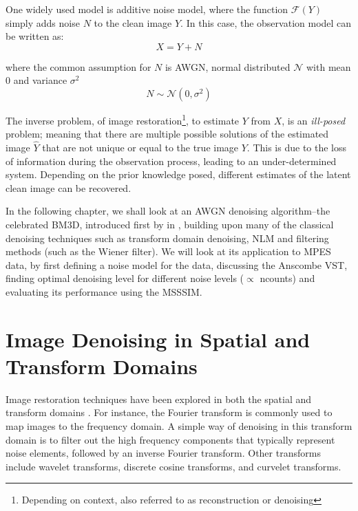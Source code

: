 One widely used model is additive noise model, where the function $\mathcal{F}(Y)$ simply adds noise $N$ to the clean image $Y$. In this case, the observation model can be written as:
\begin{equation}\label{eq:observation-model-additive}
    X = Y + N
\end{equation}

where the common assumption for $N$ is \gls{AWGN}, normal distributed $\mathcal{N}$ with mean \num{0} and variance $\sigma^2$
\begin{equation}\label{eq:awgn}
    N \sim \mathcal{N}(0, \sigma^2)
\end{equation}

The inverse problem, of image restoration\footnote{Depending on context, also referred to as reconstruction or denoising}, to estimate $Y$ from $X$, is an \textit{ill-posed} problem; meaning that there are multiple possible solutions of the estimated image $\hat{Y}$ that are not unique or equal to the true image $Y$. This is due to the loss of information during the observation process, leading to an under-determined system. Depending on the prior knowledge posed, different estimates of the latent clean image can be recovered.

In the following chapter, we shall look at an \gls{AWGN} denoising algorithm--the celebrated \gls{BM3D}, introduced first by \citeauthor{dabovImageDenoisingSparse2007} in \cite{dabovImageDenoisingSparse2007}, building upon many of the classical denoising techniques such as transform domain denoising, \gls{NLM} and filtering methods (such as the Wiener filter). We will look at its application to \gls{MPES} data, by first defining a noise model for the data, discussing the Anscombe \gls{VST}, finding optimal denoising level for different noise levels ($\propto$ \gls{ncounts}) and evaluating its performance using the \gls{MSSSIM}.

\section{Image Denoising in Spatial and Transform Domains}
Image restoration techniques have been explored in both the spatial and transform domains \cite{buadesReviewImageDenoising2005,diwakarReviewCTImage2018}. For instance, the Fourier transform is commonly used to map images to the frequency domain. A simple way of denoising in this transform domain is to filter out the high frequency components that typically represent noise elements, followed by an inverse Fourier transform. Other transforms include wavelet transforms, discrete cosine transforms, and curvelet transforms.

